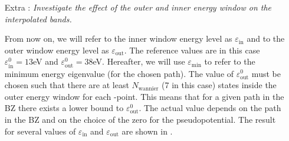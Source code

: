 \begin{enumerate}
	\item[Extra :] {\it Investigate the effect of the outer and inner energy window on the interpolated bands.}

	From now on, we will refer to the inner window energy level as $\varepsilon_{\mathrm{in}}$ and to the outer window energy level as $\varepsilon_{\mathrm{out}}$. The reference values are in this case $\varepsilon_{\mathrm{in}}^0 = 13$eV and $\varepsilon_{\mathrm{out}}^0 = 38$eV. Hereafter, we will use $\varepsilon_{\mathrm{min}}$ to refer to the minimum energy eigenvalue (for the chosen path). The value of $\varepsilon_{\mathrm{out}}^0$ must be chosen such that there are at least $N_{\mathrm{wannier}}$ (7 in this case) states inside the outer energy window for each \bfk-point. This means that for a given path in the BZ there exists a lower bound to $\varepsilon_{\mathrm{out}}^0$. The actual value depends on the path in the BZ and on the choice of the zero for the pseudopotential. The result for several values of $\varepsilon_{\mathrm{in}}$ and $\varepsilon_{\mathrm{out}}$ are shown in .



\end{enumerate}
